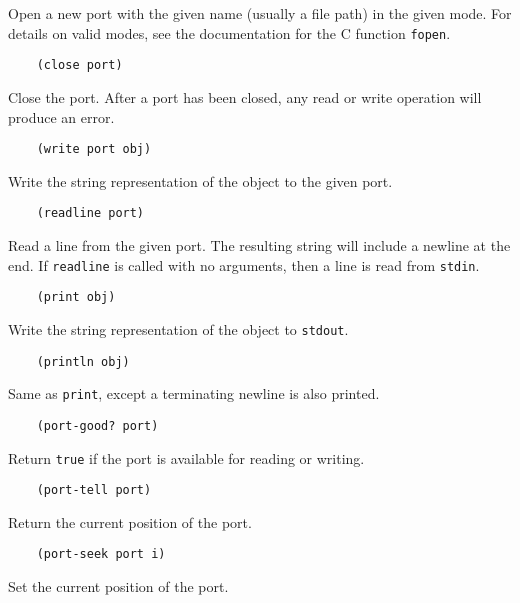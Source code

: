 \documentclass{article}
\newcommand{\inlinecode}{\texttt}
\begin{document}
Open a new port with the given name (usually a file path) in the given mode. For details on valid modes, see the documentation for the C function \inlinecode{fopen}.

\begin{verbatim}
    (close port)
\end{verbatim}

Close the port. After a port has been closed, any read or write operation will produce an error.

\begin{verbatim}
    (write port obj)
\end{verbatim}

Write the string representation of the object to the given port.

\begin{verbatim}
    (readline port)
\end{verbatim}

Read a line from the given port. The resulting string will include a newline at the end. If \inlinecode{readline} is called with no arguments, then a line is read from \inlinecode{stdin}.

\begin{verbatim}
    (print obj)
\end{verbatim}

Write the string representation of the object to \inlinecode{stdout}.

\begin{verbatim}
    (println obj)
\end{verbatim}

Same as \inlinecode{print}, except a terminating newline is also printed.

\begin{verbatim}
    (port-good? port)
\end{verbatim}

Return \inlinecode{true} if the port is available for reading or writing.

\begin{verbatim}
    (port-tell port)
\end{verbatim}

Return the current position of the port.

\begin{verbatim}
    (port-seek port i)
\end{verbatim}

Set the current position of the port.
\end{document}
